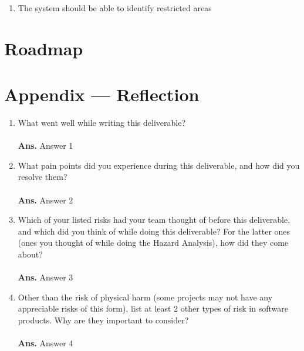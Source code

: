\documentclass{article}
\begin{document}
\begin{enumerate}[label=\textbf{PVR-\arabic*},ref=PVR-\arabic*]
    \item \label{PVR-1} The system should be able to identify restricted areas \\
\end{enumerate}

\section{Roadmap}


\newpage{}

\section*{Appendix --- Reflection}




\begin{enumerate}
    \item What went well while writing this deliverable? \\ \\
    \hspace*{-0.97cm}\textbf{Ans.} Answer 1 \\

    \item What pain points did you experience during this deliverable, and how did you resolve them? \\ \\
    \hspace*{-0.97cm}\textbf{Ans.} Answer 2 \\

    \item Which of your listed risks had your team thought of before this
    deliverable, and which did you think of while doing this deliverable? For
    the latter ones (ones you thought of while doing the Hazard Analysis), how did they come about? \\ \\
    \hspace*{-0.97cm}\textbf{Ans.} Answer 3 \\

    \item Other than the risk of physical harm (some projects may not have any appreciable risks of this form), list at least 2 other types of risk in software products. Why are they important to consider? \\ \\
    \hspace*{-0.97cm}\textbf{Ans.} Answer 4 \\

\end{enumerate}
\end{document}
